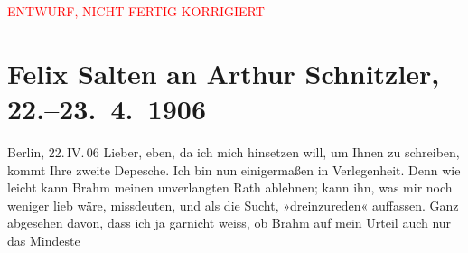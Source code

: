 
\begin{center}
            \textcolor{red}{ENTWURF, NICHT FERTIG KORRIGIERT}
                      \end{center}
            
         
         \renewcommand{\erwaehntePersonen}{Personen: Otto Brahm, Alphonse Daudet, Julius Elias, Paul Goldmann, Adalbert von Goldschmidt, Siegfried Jacobsohn, Emanuel Reicher, Rudolf Rittner, Ottilie Salten, Olga Schnitzler}
         \renewcommand{\erwaehnteOrte}{Orte: Berlin, Lessing-Theater, Wien}
         \renewcommand{\erwaehnteWerke}{Werke: Der Ruf des Lebens. Schauspiel in drei Akten, Der einsame Weg, Der einsame Weg. Schauspiel in fünf Akten, Die Schaubühne, Elga}
               \section[Felix Salten an Arthur Schnitzler, 22.–23. 4. 1906]{ Felix Salten an Arthur Schnitzler, 22.–23. 4. 1906}\nopagebreak{}\rehead{ }\begin{ledgroupsized}[t]{13cm}\normalsize\beginnumbering \toendnotes[C]{\smallbreak\pagebreak[2]} 
\toendnotes[C]{\smallbreak}\pstart
           \raggedleft{}{\pb} Berlin, 22. IV. 06\pend
           \pstart
           Lieber, eben, da ich mich hinsetzen will, um Ihnen zu schreiben,
               kommt Ihre zweite Depesche. Ich bin nun einigermaßen in Verlegenheit. Denn wie leicht
               kann Brahm meinen unverlangten Rath ablehnen;
               kann ihn, was mir noch weniger lieb wäre, missdeuten, und als die Sucht,
               »dreinzureden« auffassen. Ganz abgesehen davon, dass ich ja garnicht weiss, ob Brahm auf mein Urteil auch nur das Mindeste

\end{ledgroupsized}
